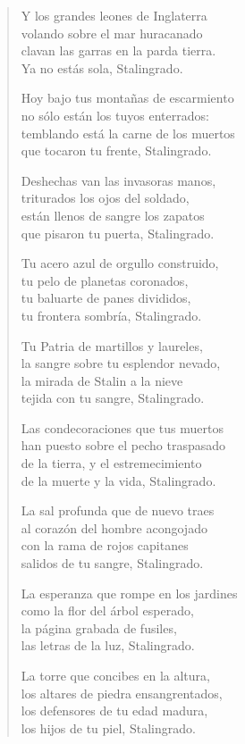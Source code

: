 \documentclass[12pt]{article}
\begin{document}
\begin{verse}
Y los grandes leones de Inglaterra\\
volando sobre el mar huracanado\\
clavan las garras en la parda tierra.\\
Ya no estás sola, Stalingrado.  

Hoy bajo tus montañas de escarmiento\\
no sólo están los tuyos enterrados:\\
temblando está la carne de los muertos\\
que tocaron tu frente, Stalingrado.  

Deshechas van las invasoras manos,\\
triturados los ojos del soldado,\\
están llenos de sangre los zapatos\\
que pisaron tu puerta, Stalingrado.  

Tu acero azul de orgullo construido,\\
tu pelo de planetas coronados,\\
tu baluarte de panes divididos,\\
tu frontera sombría, Stalingrado.  

Tu Patria de martillos y laureles,\\
la sangre sobre tu esplendor nevado,\\
la mirada de Stalin a la nieve\\
tejida con tu sangre, Stalingrado.  

Las condecoraciones que tus muertos\\
han puesto sobre el pecho traspasado\\
de la tierra, y el estremecimiento\\
de la muerte y la vida, Stalingrado.  

La sal profunda que de nuevo traes\\
al corazón del hombre acongojado\\
con la rama de rojos capitanes\\
salidos de tu sangre, Stalingrado.  

La esperanza que rompe en los jardines\\
como la flor del árbol esperado,\\
la página grabada de fusiles,\\
las letras de la luz, Stalingrado.  

La torre que concibes en la altura,\\
los altares de piedra ensangrentados,\\
los defensores de tu edad madura,\\
los hijos de tu piel, Stalingrado.  


\end{verse}
\end{document}
